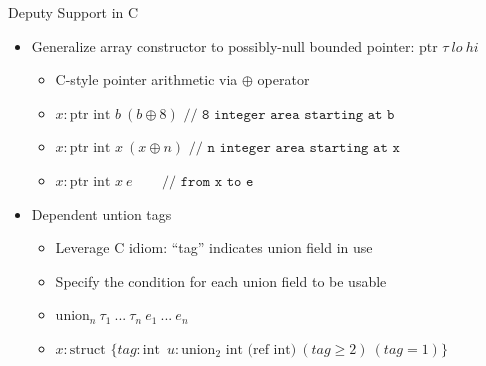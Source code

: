 \documentclass[aspectratio=169]{beamer}
\begin{document}
\begin{frame}
\end{frame}

\begin{frame}{Deputy}
Support in C
    \begin{itemize}
        \item Generalize array constructor to possibly-null bounded pointer: \emph{$\text{ptr }\tau \ lo\ hi$}
            \begin{itemize}
                \item C-style pointer arithmetic via $\oplus$ operator
                \item $x:\text{ptr int } b\ (b \oplus 8)$ $\texttt{// 8 integer area starting at b}$
                \item $x:\text{ptr int } x\ (x \oplus n)$ $\texttt{// n integer area starting at x}$
                \item $x:\text{ptr int } x\ e\ \ \ \ \ \ \ \ $ $\texttt{// from x to e}$
            \end{itemize}
        \item Dependent untion tags
            \begin{itemize}
                \item Leverage C idiom: ``tag'' indicates union field in use
                \item Specify the condition for each union field to be usable
                \item \emph{$\text{union}_n\ \tau_1\ ...\ \tau_n\ e_1\ ...\ e_n$}
                \item $x:\text{struct }\{ tag:\text{int}\;\ u: \text{union}_2 \text{ int (ref int)} \ (\textit{tag} \geq 2)\ (\textit{tag} = 1) \}$
            \end{itemize}
    \end{itemize}
\end{frame}
\end{document}
